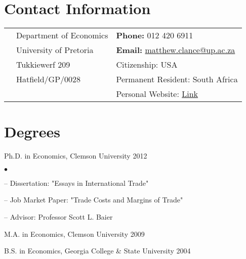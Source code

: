 \documentclass[margin,line]{res}                          %
\newenvironment{list1}{
  \begin{list}{\ding{113}}{%
      \setlength{\itemsep}{0.4em}
      \setlength{\parsep}{0in} \setlength{\parskip}{0in}
      \setlength{\topsep}{0in} \setlength{\partopsep}{0in} 
      \setlength{\leftmargin}{0.17in}}}{\end{list}}
\newenvironment{list2}{
  \begin{list}{$\bullet$}{%
      \setlength{\itemsep}{.2em}
      \setlength{\parsep}{0in} \setlength{\parskip}{0in}
      \setlength{\topsep}{.1em} \setlength{\partopsep}{0in} 
      \setlength{\leftmargin}{0.2in}}}{\end{list}}
\begin{document}


\begin{resume}
\thispagestyle{plain} %

\section{\sc Contact Information}
\vspace{.05in}
\begin{tabular}{@{}p{0.20in}p{2.75in}p{2.75in}}
 & Department of Economics            & \textbf{Phone: }012 420 6911 \\            
 & University of Pretoria   & \textbf{Email: }\href{mailto: matthew.clance@up.ac.za}{matthew.clance@up.ac.za} \\         
 & Tukkiewerf 209 & Citizenship: USA  \\       
 & Hatfield/GP/0028  & Permanent Resident: South Africa \\
 &                   & Personal Website: \href{https://sites.google.com/view/matthew-clance/home}{Link}
 \end{tabular}
 \vspace*{.2in}



\section{\sc Degrees}
\begin{list1}
\item[] Ph.D. in Economics, Clemson University \hfill 2012 \newline  \vspace*{-.15in}
	\begin{list2}
		\item[--] Dissertation: "Essays in International Trade"
		\item[--] Job Market Paper: "Trade Costs and Margins of Trade"
		\item[--] Advisor: Professor Scott L. Baier
	\end{list2}
\item[] M.A. in Economics, Clemson University \hfill 2009 
\item[] B.S. in Economics, Georgia College \& State University \hfill 2004
\end{list1}


\end{resume}
\end{document}
